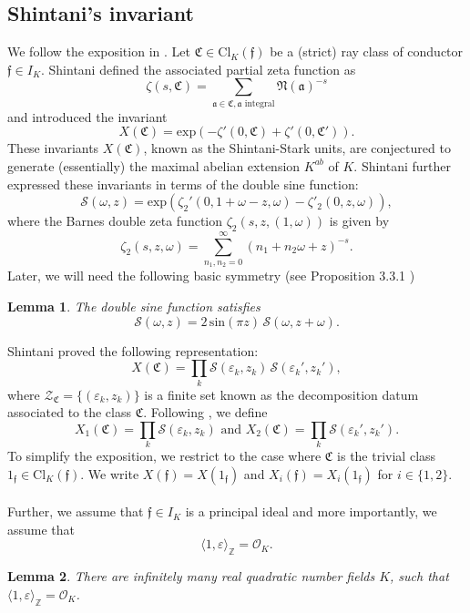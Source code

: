\documentclass[11pt, a4paper]{amsart}
\newcommand{\ep}{\varepsilon}
\newcommand{\eq}[1]{\begin{equation}#1\end{equation}}
\theoremstyle{plain}
\newtheorem{lemma}{Lemma}[section]
\numberwithin{equation}{section}
\begin{document}
 \subsection{Shintani's invariant}
We follow the exposition in \cite{Shintani1977,yamamoto2008kronecker}.
Let $\mathfrak C \in \mathrm{Cl}_K(\mathfrak f)$ be a (strict) ray class of conductor $\mathfrak f \in I_K$. Shintani defined the associated partial zeta function as \eq{\zeta(s,\mathfrak C) = \sum_{\mathfrak a \in \mathfrak C, \mathfrak a \text{ integral}} \mathfrak{N}(\mathfrak a)^{-s}} and introduced the invariant \eq{X(\mathfrak C) = \mathrm{exp}(-\zeta'(0,\mathfrak C) + \zeta'(0,\mathfrak C ')).}
These invariants $X(\mathfrak C)$, known as the Shintani-Stark units, are conjectured to generate (essentially) the maximal abelian extension $K^{ab}$ of $K$. Shintani further expressed these invariants in terms of the double sine function: \eq{\label{doublesine}\mathcal S(\omega,z) = \mathrm{exp}(\zeta_2'(0,1+\omega-z,\omega)-\zeta'_2(0,z,\omega)),}
where the Barnes double zeta function $\zeta_2(s,z,(1,\omega))$ is given by \eq{\zeta_2(s,z,\omega) = \sum_{n_1,n_2=0}^\infty (n_1+n_2 \omega+z)^{-s}.}
\noindent Later, we will need the following basic symmetry (see Proposition 3.3.1 \cite{yamamoto2008kronecker})
\begin{lemma}
\label{symmetry}
The double sine function satisfies \eq{\mathcal S(\omega,z) = 2 \, \mathrm{sin}(\pi z) \, \mathcal S(\omega,z+\omega).}
\end{lemma}
\noindent Shintani proved the following representation:
\eq{X(\mathfrak C) = \prod_k \mathcal S(\ep_k,z_k) \,\mathcal S(\ep_k',z_k'),}
where $\mathcal Z _{\mathfrak C} = \{(\ep_k,z_k)\}$ is a finite set known as the decomposition datum associated to the class $\mathfrak C$.
Following \cite{yamamoto2008kronecker}, we define \eq{\label{ShintaniValues}X_1(\mathfrak C) = \prod_{k}\mathcal S(\ep_k,z_k) \text{ and } X_2(\mathfrak C) = \prod_k \mathcal S(\ep_k',z_k').}
\noindent To simplify the exposition, we restrict to the case where $\mathfrak C$ is the trivial class $1_\mathfrak f \in \mathrm{Cl}_K(\mathfrak f)$. We write $X(\mathfrak f) = X(1_\mathfrak f)$ and $X_i(\mathfrak f) = X_{i}(1_\mathfrak f) $ for $i \in \{1,2\}$. \\ \\
Further, we assume that $\mathfrak f \in I_K$ is a principal ideal and more importantly, we assume that \eq{\langle 1,\ep\rangle_\mathbb Z = \mathcal O _K.} \begin{lemma} There are infinitely many real quadratic number fields $K$, such that $\langle 1,\ep\rangle_\mathbb Z = \mathcal O _K$. \end{lemma}
\end{document}
